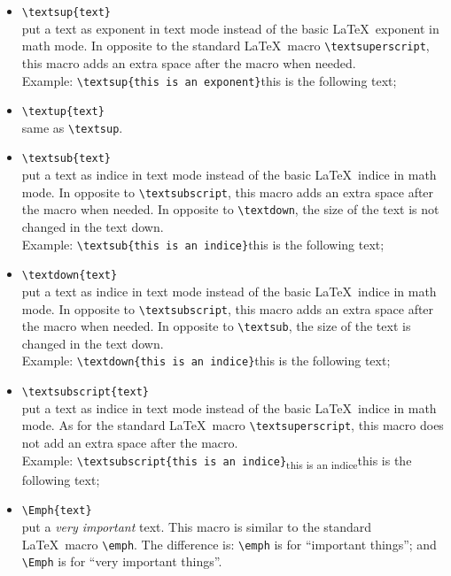 \documentclass[book,taskpackage,specpackage,codepackage]{upmethodology-document}
\begin{document}
\begin{itemize}
\item \texttt{{\textbackslash}textsup\{text\}} \\
	put a text as exponent in text mode instead of the basic \LaTeX\ exponent in math mode. In opposite to the standard \LaTeX\ macro \texttt{{\textbackslash}textsuperscript}, this macro adds an extra space after the macro when needed. \\
	Example: \texttt{{\textbackslash}textsup\{this is an exponent\}}this is the following text;
\item \texttt{{\textbackslash}textup\{text\}} \\
	same as \texttt{{\textbackslash}textsup}.
\item \texttt{{\textbackslash}textsub\{text\}} \\
	put a text as indice in text mode instead of the basic \LaTeX\ indice in math mode. In opposite to \texttt{{\textbackslash}textsubscript}, this macro adds an extra space after the macro when needed. In opposite to \texttt{{\textbackslash}textdown}, the size of the text is not changed in the text down. \\
	Example: \texttt{{\textbackslash}textsub\{this is an indice\}}this is the following text;
\item \texttt{{\textbackslash}textdown\{text\}} \\
	put a text as indice in text mode instead of the basic \LaTeX\ indice in math mode. In opposite to \texttt{{\textbackslash}textsubscript}, this macro adds an extra space after the macro when needed. In opposite to \texttt{{\textbackslash}textsub}, the size of the text is changed in the text down. \\
	Example: \texttt{{\textbackslash}textdown\{this is an indice\}}this is the following text;
\item \texttt{{\textbackslash}textsubscript\{text\}} \\
	put a text as indice in text mode instead of the basic \LaTeX\ indice in math mode. As for the standard \LaTeX\ macro \texttt{{\textbackslash}textsuperscript}, this macro does not add an extra space after the macro. \\
	Example: \texttt{{\textbackslash}textsubscript\{this is an indice\}}\textsubscript{this is an indice}this is the following text;
\item \texttt{{\textbackslash}Emph\{text\}} \\
	put a \emph{very important} text. This macro is similar to the standard \LaTeX\ macro \texttt{{\textbackslash}emph}. The difference is: \texttt{{\textbackslash}emph} is for ``important things''; and \texttt{{\textbackslash}Emph} is for ``very important things''.\\

\end{itemize}
\end{document}
